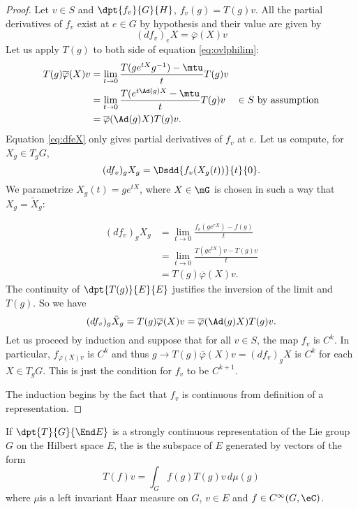 \begin{proof}
	Let $v\in S$ and $\dpt{ f_v }{ G }{ H }$, $f_v(g)=T(g)v$. All the partial derivatives of $f_v$ exist at $e\in G$ by hypothesis and their value are given by
	\begin{equation} \label{eq:dfeX}
		(df_v)_eX=\overline{ \varphi }(X)v
	\end{equation}
	Let us apply $T(g)$ to both side of equation \eqref{eq:ovlphilim}:
	\begin{equation}
		\begin{aligned}
			T(g)\overline{ \varphi }(X)v & =\lim_{t\to 0}\frac{ T(ge^{tX}g^{-1})-\mtu }{ t }T(g)v                                \\
			                             & =\lim_{t\to 0}\frac{ T(e^{t\Ad(g)X}-\mtu }{ t }T(g)v   & \in S\textrm{ by assumption} \\
			                             & =\overline{ \varphi }(\Ad(g)X)T(g)v.
		\end{aligned}
	\end{equation}
	Equation \eqref{eq:dfeX} only gives partial derivatives of $f_v$ at $e$. Let us compute, for $X_g\in T_gG$,
	\[
		(df_v)_gX_g=\Dsdd{ f_v(X_g(t)) }{t}{0}.
	\]
	We parametrize $X_g(t)=ge^{tX}$, where $X\in\mG$ is chosen in such a way that $X_g= \tilde X_g$:

	\begin{equation}
		\begin{split}
			(df_v)_gX_g&=\lim_{t\to0}\frac{ f_v(ge^{rX})-f(g) }{ t }\\
			&=\lim_{t\to 0}\frac{ T(ge^{tX})v-T(g)v }{ t }\\
			&=T(g)\overline{ \varphi }(X)v.
		\end{split}
	\end{equation}
	The continuity of $\dpt{ T(g) }{ E }{ E }$ justifies the inversion of the limit and $T(g)$. So we have
	\[
		(df_v)_g\tilde X_g=T(g)\overline{ \varphi }(X)v=\overline{ \varphi }(\Ad(g)X)T(g)v.
	\]
	Let us proceed by induction and suppose that for all $v\in S$, the map $f_v$ is $C^k$. In particular, $f_{\overline{ \varphi }(X)v}$ is $C^k$ and thus $g\to T(g)\overline{ \varphi }(X)v=(df_v)_gX$ is $C^k$ for each $X\in T_gG$. This is just the condition for $f_v$ to be $C^{k+1}$.

	The induction begins by the fact that $f_v$ is continuous from definition of a representation.

\end{proof}

\begin{definition}

	If $\dpt{ T }{ G }{ \End E }$ is a strongly continuous representation of the Lie group $G$ on the Hilbert space $E$, the  is the subspace of $E$ generated by vectors of the form
	\begin{equation}
		T(f)v=\int_Gf(g)T(g)v\,d\mu(g)
	\end{equation}
	where $\mu$is a left invariant Haar measure on $G$, $v\in E$ and $f\in C^{\infty}(G,\eC)$.

\end{definition}

